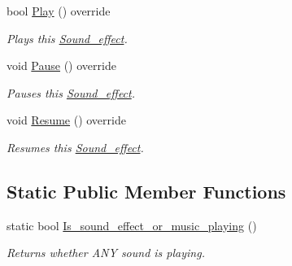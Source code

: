 \begin{DoxyCompactItemize}
bool \hyperlink{classjetfuel_1_1media_1_1Sound__effect_a206d3653259cc854fd80fa44a9d333c4}{Play} () override
\begin{DoxyCompactList}\small\item\em Plays this \hyperlink{classjetfuel_1_1media_1_1Sound__effect}{Sound\+\_\+effect}. \end{DoxyCompactList}\item 
void \hyperlink{classjetfuel_1_1media_1_1Sound__effect_a5fa5bb67a349bac545f233a6aa8a030d}{Pause} () override
\begin{DoxyCompactList}\small\item\em Pauses this \hyperlink{classjetfuel_1_1media_1_1Sound__effect}{Sound\+\_\+effect}. \end{DoxyCompactList}\item 
void \hyperlink{classjetfuel_1_1media_1_1Sound__effect_a8849f5324b2c049c63ed3a0bbbd88467}{Resume} () override
\begin{DoxyCompactList}\small\item\em Resumes this \hyperlink{classjetfuel_1_1media_1_1Sound__effect}{Sound\+\_\+effect}. \end{DoxyCompactList}\end{DoxyCompactItemize}
\subsection*{Static Public Member Functions}
\begin{DoxyCompactItemize}
\item 
static bool \hyperlink{classjetfuel_1_1media_1_1Sound__effect_ae81630f796281931d9c2f1dc3a0e9319}{Is\+\_\+sound\+\_\+effect\+\_\+or\+\_\+music\+\_\+playing} ()
\begin{DoxyCompactList}\small\item\em Returns whether A\+NY sound is playing. \end{DoxyCompactList}\end{DoxyCompactItemize}
